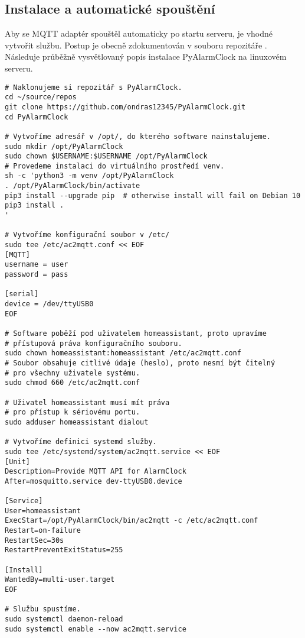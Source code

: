 \subsection{Instalace a automatické spouštění}
Aby se MQTT adaptér spouštěl automaticky po startu serveru, je vhodné vytvořit
 službu. Postup je obecně zdokumentován v souboru
 repozitáře . Následuje průběžně
vysvětlovaný popis instalace PyAlarmClock na linuxovém serveru.
\begin{lstlisting}[language=mybash, style=numbers]
# Naklonujeme si repozitář s PyAlarmClock.
cd ~/source/repos
git clone https://github.com/ondras12345/PyAlarmClock.git
cd PyAlarmClock

# Vytvoříme adresář v /opt/, do kterého software nainstalujeme.
sudo mkdir /opt/PyAlarmClock
sudo chown $USERNAME:$USERNAME /opt/PyAlarmClock
# Provedeme instalaci do virtuálního prostředí venv.
sh -c 'python3 -m venv /opt/PyAlarmClock
. /opt/PyAlarmClock/bin/activate
pip3 install --upgrade pip  # otherwise install will fail on Debian 10
pip3 install .
'

# Vytvoříme konfigurační soubor v /etc/
sudo tee /etc/ac2mqtt.conf << EOF
[MQTT]
username = user
password = pass

[serial]
device = /dev/ttyUSB0
EOF

# Software poběží pod uživatelem homeassistant, proto upravíme
# přístupová práva konfiguračního souboru.
sudo chown homeassistant:homeassistant /etc/ac2mqtt.conf
# Soubor obsahuje citlivé údaje (heslo), proto nesmí být čitelný
# pro všechny uživatele systému.
sudo chmod 660 /etc/ac2mqtt.conf

# Uživatel homeassistant musí mít práva
# pro přístup k sériovému portu.
sudo adduser homeassistant dialout

# Vytvoříme definici systemd služby.
sudo tee /etc/systemd/system/ac2mqtt.service << EOF
[Unit]
Description=Provide MQTT API for AlarmClock
After=mosquitto.service dev-ttyUSB0.device

[Service]
User=homeassistant
ExecStart=/opt/PyAlarmClock/bin/ac2mqtt -c /etc/ac2mqtt.conf
Restart=on-failure
RestartSec=30s
RestartPreventExitStatus=255

[Install]
WantedBy=multi-user.target
EOF

# Službu spustíme.
sudo systemctl daemon-reload
sudo systemctl enable --now ac2mqtt.service
\end{lstlisting}

